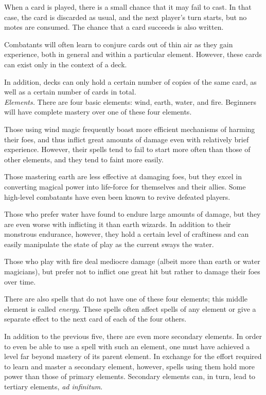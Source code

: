 {	When a card is played, there is a small chance that it may fail to cast. In that case, the card is discarded as usual, and the next player's turn starts, but no motes are consumed. The chance that a card succeeds is also written.
	
	Combatants will often learn to conjure cards out of thin air as they gain experience, both in general and within a particular element. However, these cards can exist only in the context of a deck.
	
	In addition, decks can only hold a certain number of copies of the same card, as well as a certain number of cards in total. \\
	
	\emph{Elements.} There are four basic elements: wind, earth, water, and fire. Beginners will have complete mastery over one of these four elements.
	
	Those using wind magic frequently boast more efficient mechanisms of harming their foes, and thus inflict great amounts of damage even with relatively brief experience. However, their spells tend to fail to start more often than those of other elements, and they tend to faint more easily.
	
	Those mastering earth are less effective at damaging foes, but they excel in converting magical power into life-force for themselves and their allies. Some high-level combatants have even been known to revive defeated players.
	
	Those who prefer water have found to endure large amounts of damage, but they are even worse with inflicting it than earth wizards. In addition to their monstrous endurance, however, they hold a certain level of craftiness and can easily manipulate the state of play as the current sways the water.
	
	Those who play with fire deal mediocre damage (albeit more than earth or water magicians), but prefer not to inflict one great hit but rather to damage their foes over time.
	
	There are also spells that do not have one of these four elements; this middle element is called \emph{energy}. These spells often affect spells of any element or give a separate effect to the next card of each of the four others.
	
	In addition to the previous five, there are even more secondary elements. In order to even be able to use a spell with such an element, one must have achieved a level far beyond mastery of its parent element. In exchange for the effort required to learn and master a secondary element, however, spells using them hold more power than those of primary elements. Secondary elements can, in turn, lead to tertiary elements, \emph{ad infinitum}. \\
	
}
